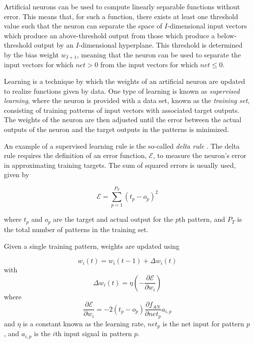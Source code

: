 \documentclass[master]{outhesis}
\begin{document}
Artificial neurons can be used to compute linearly separable functions without error. This means that, for such a function, there exists at least one threshold value such that the neuron can separate the space of $I$-dimensional input vectors which produce an above-threshold output from those which produce a below-threshold output by an $I$-dimensional hyperplane. This threshold is determined by the bias weight $w_{I+1}$, meaning that the neuron can be used to separate the input vectors for which $net > 0$ from the input vectors for which $net \le 0$.

Learning is a technique by which the weights of an artificial neuron are updated to realize functions given by data.
One type of learning is known as \emph{supervised learning}, where the neuron is provided with a data set, known as the \emph{training set}, consisting of training patterns of input vectors with associated target outputs.
The weights of the neuron are then adjusted until the error between the actual outputs of the neuron and the target outputs in the patterns is minimized.

An example of a supervised learning rule is the so-called \emph{delta rule} \cite{Widrow:1960aa}.
The delta rule requires the definition of an error function, $\mathcal{E}$, to measure the neuron's error in approximating training targets.
The sum of squared errors is usually used, given by

\begin{displaymath}
\mathcal{E} = \sum_{p=1}^{P_T}(t_p-o_p)^2
\end{displaymath}

where $t_p$ and $o_p$ are the target and actual output for the $p$th pattern, and $P_T$ is the total number of patterns in the training set.

Given a single training pattern, weights are updated using

\begin{displaymath}
w_i(t) = w_i(t - 1) + \Delta w_i(t)
\end{displaymath}
with
\begin{displaymath}
\Delta w_i(t) = \eta(- \frac{\partial \mathcal{E}}{\partial w_i})
\end{displaymath}
where
\begin{displaymath}
\frac{\partial \mathcal{E}}{\partial w_i} = -2(t_p - o_p)\frac{\partial f_{AN}}{\partial net_p}a_{i,p}
\end{displaymath}
and $\eta$ is a constant known as the learning rate, $net_p$ is the net input for pattern $p$, and $a_{i,p}$ is the $i$th input signal in pattern $p$.
\end{document}
